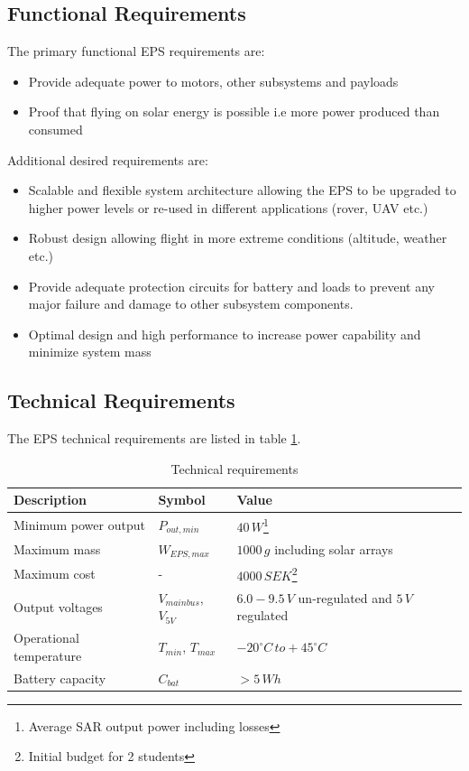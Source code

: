 \subsection{Functional Requirements}
The primary functional \ac{EPS} requirements are:
%
\begin{itemize}
\item Provide adequate power to motors, other subsystems and payloads
\item Proof that flying on solar energy is possible i.e more power produced than consumed
\end{itemize}
%
Additional desired requirements are:
%
\begin{itemize}
\item Scalable and flexible system architecture allowing the \ac{EPS} to be upgraded to higher power levels or re-used in different applications (rover, \ac{UAV} etc.)
\item Robust design allowing flight in more extreme conditions (altitude, weather etc.)
\item Provide adequate protection circuits for battery and loads to prevent any major failure and damage to other subsystem components.
\item Optimal design and high performance to increase power capability and minimize system mass
\end{itemize}
%
\subsection{Technical Requirements}
The \ac{EPS} technical requirements are listed in table \ref{tab:technical_requirements}.
%
\begin{table}[H]
\centering
\caption{Technical requirements}
\label{tab:technical_requirements}
\begin{minipage}{\textwidth}
\begin{tabular}{p{}p{}p{}}
\hline
\textbf{Description} & \textbf{Symbol} & \textbf{Value}\\
\hline
Minimum power output & $P_{out,min}$ & $40\,W$\footnote{Average \ac{SAR} output power including losses}\\
Maximum mass & $W_{EPS,max}$ & $1000\,g$ including solar arrays\\
Maximum cost & - & $4000\,SEK$\footnote{Initial budget for 2 students}\\
Output voltages & $V_{mainbus}$, $V_{5V}$ & $6.0-9.5\,V$ un-regulated and $5\,V$ regulated\\
Operational temperature & $T_{min}$, $T_{max}$ & $-20^{\circ}C\,to +45^{\circ}C$\\
Battery capacity & $C_{bat}$ & $>5\,Wh$\\
\hline
\end{tabular}\par
\vspace{-0.75\skip\footins}
\renewcommand{\footnoterule}{}
\end{minipage}
\end{table}
%
